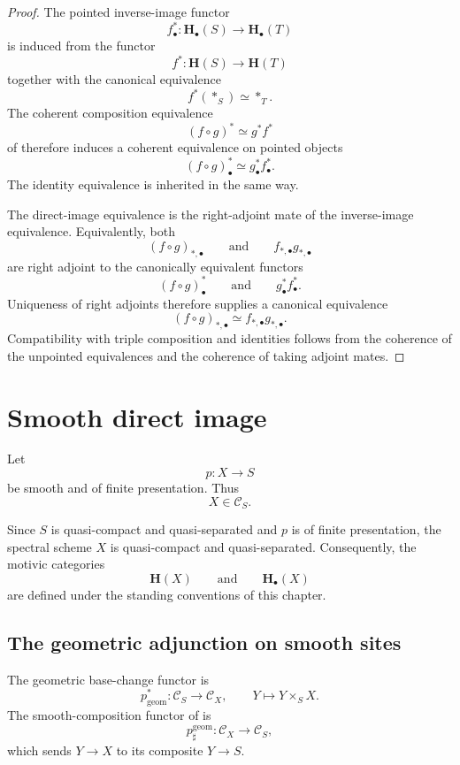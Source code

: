\begin{proof}
The pointed inverse-image functor
\[
    f^*_\bullet
    \colon
    \mathbf H_\bullet(S)
    \longrightarrow
    \mathbf H_\bullet(T)
\]
is induced from the functor
\[
    f^*
    \colon
    \mathbf H(S)
    \longrightarrow
    \mathbf H(T)
\]
together with the canonical equivalence
\[
    f^*(*_S)
    \simeq
    *_T.
\]
The coherent composition equivalence
\[
    (f\circ g)^*
    \simeq
    g^*f^*
\]
of
therefore induces a coherent equivalence on pointed objects
\[
    (f\circ g)^*_\bullet
    \simeq
    g^*_\bullet f^*_\bullet.
\]
The identity equivalence is inherited in the same way.

The direct-image equivalence is the right-adjoint mate of the
inverse-image equivalence. Equivalently, both
\[
    (f\circ g)_{*,\bullet}
    \qquad\text{and}\qquad
    f_{*,\bullet}g_{*,\bullet}
\]
are right adjoint to the canonically equivalent functors
\[
    (f\circ g)^*_\bullet
    \qquad\text{and}\qquad
    g^*_\bullet f^*_\bullet.
\]
Uniqueness of right adjoints therefore supplies a canonical
equivalence
\[
    (f\circ g)_{*,\bullet}
    \simeq
    f_{*,\bullet}g_{*,\bullet}.
\]
Compatibility with triple composition and identities follows from the
coherence of the unpointed equivalences and the coherence of taking
adjoint mates.
\end{proof}

\section{Smooth direct image}
\label{sec:brave-new-motivic-smooth-direct-image}

Let
\[
    p
    \colon
    X
    \longrightarrow
    S
\]
be smooth and of finite presentation.  Thus
\[
    X
    \in
    \mathcal C_S.
\]

Since \(S\) is quasi-compact and quasi-separated and \(p\) is of finite
presentation, the spectral scheme \(X\) is quasi-compact and
quasi-separated. Consequently, the motivic categories
\[
    \mathbf H(X)
    \qquad\text{and}\qquad
    \mathbf H_\bullet(X)
\]
are defined under the standing conventions of this chapter.

\subsection{The geometric adjunction on smooth sites}

The geometric base-change functor is
\[
    p^*_{\mathrm{geom}}
    \colon
    \mathcal C_S
    \longrightarrow
    \mathcal C_X,
    \qquad
    Y
    \longmapsto
    Y\times_SX.
\]
The smooth-composition functor of
is
\[
    p^{\mathrm{geom}}_\sharp
    \colon
    \mathcal C_X
    \longrightarrow
    \mathcal C_S,
\]
which sends \(Y\to X\) to its composite \(Y\to S\).

